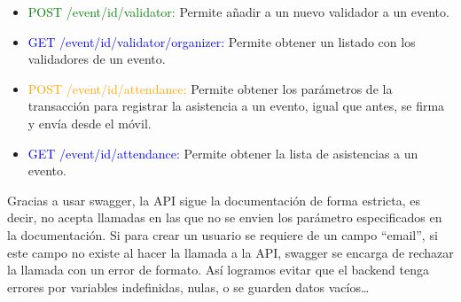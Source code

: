 \begin{itemize}
\item \textcolor{green}{{\footnotesize POST} /event/{id}/validator:} Permite añadir a un nuevo validador a un evento.
\item \textcolor{blue}{{\footnotesize GET} /event/{id}/validator/{organizer}:} Permite obtener un listado con los validadores de un evento. 
\item \textcolor{orange}{{\footnotesize POST} /event/{id}/attendance:} Permite obtener los parámetros de la transacción para registrar la asistencia a un evento, igual que antes, se firma y envía desde el móvil. 
\item \textcolor{blue}{{\footnotesize GET} /event/{id}/attendance:} Permite obtener la lista de asistencias a un evento. 
\end{itemize}

Gracias a usar swagger, la API sigue la documentación de forma estricta, es decir, no acepta llamadas en las que no se envien los parámetro especificados en la documentación. Si para crear un usuario se requiere de un campo ``email'', si este campo no existe al hacer la llamada a la API, swagger se encarga de rechazar la llamada con un error de formato. Así logramos evitar que el backend tenga errores por variables indefinidas, nulas, o se guarden datos vacíos\dots


